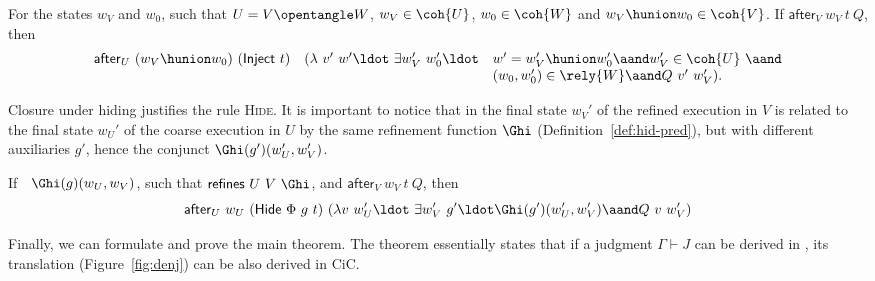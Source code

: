\begin{lemma}
\label{lm:aft-extend} 
%
For the states $w_V$ and $w_0$, such that $U = V \opentangle W$, $w_V
\in \coh{U}$, $w_0 \in \coh{W}$ and $w_V \hunion w_0 \in \coh{V}$.
%
If $\mathsf{after}_V~w_V~t~Q$, then 
%
\[
\begin{array}{rll}
\mathsf{after}_U~(w_V \hunion w_0)~(\mathsf{Inject}~t) &
  (\lambda~v'~w'\ldot~ \exists w_V'~w_0'\ldot & 
  w' = w_V' \hunion w_0' \aand w_V' \in \coh{U} ~\aand \\
  && (w_0, w_0') \in \rely{W} \aand Q~v'~w_V').
\end{array}
\]
%
\end{lemma}

Closure under hiding justifies the rule \textsc{Hide}. It is important
to notice that in the final state $w_V'$ of the refined execution in
$V$ is related to the final state $w_U'$ of the coarse execution in
$U$ by the same refinement function $\Ghi$
(Definition~\ref{def:hid-pred}), but with different auxiliaries $g'$,
hence the conjunct $\Ghi(g')(w_U', w_V')$.




\begin{lemma}
\label{lm:aft-hide}
%
If~~$\Ghi(g)(w_U, w_V)$, such that $\mathsf{refines}~U~V~\Ghi$, and 
$\mathsf{after}_V~w_V~t~Q$, then
%
\[
\mathsf{after}_U~w_U~(\mathsf{Hide}~\Phi~g~t)~
(\lambda v~w_U'\ldot~ \exists w_V'~g' \ldot \Ghi(g')(w_U', w_V') \aand Q~v~w_V')
\]
  
\end{lemma}






Finally, we can formulate and prove the main theorem. The theorem
essentially states that if a judgment $\Gamma \vdash J$ can be
derived in \SCST, its translation (Figure~\ref{fig:denj}) can be also derived in CiC.

